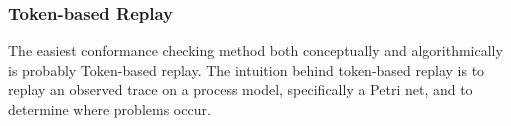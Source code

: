 \documentclass[runningheads]{template/llncs}
\begin{document}
%

\subsubsection{Token-based Replay}

The easiest conformance checking method both conceptually and algorithmically is probably Token-based replay.
The intuition behind token-based replay is to replay an observed trace on a process model, specifically a Petri net, and to determine where problems occur.
\end{document}
